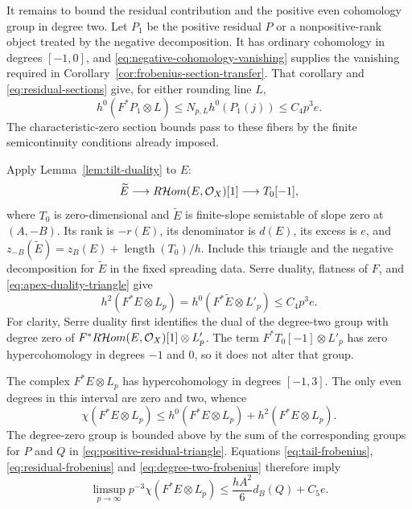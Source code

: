 It remains to bound the residual contribution and the positive
even cohomology group in degree two.  Let $P_1$ be the positive
residual $P$ or a nonpositive-rank object treated by the negative
decomposition.  It has ordinary cohomology in degrees $[-1,0]$,
and \eqref{eq:negative-cohomology-vanishing} supplies the vanishing
required in Corollary~\ref{cor:frobenius-section-transfer}.
That corollary and \eqref{eq:residual-sections} give, for either
rounding line $L$,
\begin{equation}\label{eq:residual-frobenius}
 h^0(F^*P_1\otimes L)
 \leq N_{p,L}h^0(P_1(j))\leq C_4p^3e.
\end{equation}
The characteristic-zero section bounds pass to these fibers by
the finite semicontinuity conditions already imposed.

Apply Lemma~\ref{lem:tilt-duality} to $E$:
\begin{equation}\label{eq:apex-duality-triangle}
 \widetilde E\longrightarrow R\mathcal Hom(E,\mathcal O_X)[1]
 \longrightarrow T_0[-1],
\end{equation}
where $T_0$ is zero-dimensional and $\widetilde E$ is finite-slope
semistable of slope zero at $(A,-B)$.  Its rank is $-r(E)$,
its denominator is $d(E)$, its excess is $e$, and
$z_{-B}(\widetilde E)=z_B(E)+\operatorname{length}(T_0)/h$.
Include this triangle and the negative decomposition for
$\widetilde E$ in the fixed spreading data.  Serre duality,
flatness of $F$, and \eqref{eq:apex-duality-triangle} give
\begin{equation}\label{eq:degree-two-frobenius}
 h^2(F^*E\otimes L_p)
 =h^0(F^*\widetilde E\otimes L'_p)\leq C_4p^3e.
\end{equation}
For clarity, Serre duality first identifies the dual of the
degree-two group with degree zero of
$F^*R\mathcal Hom(E,\mathcal O_X)[1]\otimes L'_p$.
The term $F^*T_0[-1]\otimes L'_p$ has zero hypercohomology in
degrees $-1$ and $0$, so it does not alter that group.

The complex $F^*E\otimes L_p$ has hypercohomology in degrees
$[-1,3]$.  The only even degrees in this interval are zero and
two, whence
\[
 \chi(F^*E\otimes L_p)
 \leq h^0(F^*E\otimes L_p)+h^2(F^*E\otimes L_p).
\]
The degree-zero group is bounded above by the sum of the
corresponding groups for $P$ and $Q$ in
\eqref{eq:positive-residual-triangle}.  Equations
\eqref{eq:tail-frobenius}, \eqref{eq:residual-frobenius} and
\eqref{eq:degree-two-frobenius} therefore imply
\begin{equation}\label{eq:euler-frobenius-bound}
 \limsup_{p\to\infty}p^{-3}\chi(F^*E\otimes L_p)
 \leq\frac{hA^2}{6}d_B(Q)+C_5e.
\end{equation}

